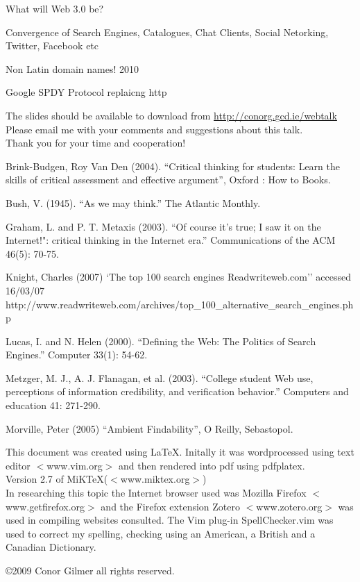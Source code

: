 \documentclass[30pt,landscape,footrule]{foils}
\begin{document}
{\color{magenta}
What will Web 3.0 be?
\begin{itemize}
\small{
\item Convergence of Search Engines, Catalogues, Chat Clients, Social Netorking, Twitter, Facebook etc
\item Non Latin domain names! 2010
\item Google SPDY Protocol replaicng http
}
\end{itemize}
}



\pausecolorreset

The slides should be available to download from 
\href{http://conorg.gcd.ie/webtalk/}{http://conorg.gcd.ie/webtalk}
Please email me with your comments and suggestions about this talk.\\
Thank you for your time and cooperation!

\begin{itemize}
\small {
\item Brink-Budgen, Roy Van Den (2004). ``Critical thinking for students: Learn the skills of critical assessment and effective argument'', Oxford : How to Books.
\item Bush, V. (1945). ``As we may think.'' The Atlantic Monthly.
\item Graham, L. and P. T. Metaxis (2003). ``Of course it's true; I saw it on the Internet!": critical thinking in the Internet era.'' Communications of the ACM 46(5): 70-75.
\item Knight, Charles (2007) `The top 100 search engines Readwriteweb.com'' accessed 16/03/07 http://www.readwriteweb.com/archives/top\_100\_alternative\_search\_engines.php
\item Lucas, I. and N. Helen (2000). ``Defining the Web: The Politics of Search Engines.'' Computer 33(1): 54-62.
\item Metzger, M. J., A. J. Flanagan, et al. (2003). ``College student Web use, perceptions of information credibility, and verification behavior.'' Computers and education 41: 271-290.
\item Morville, Peter (2005) ``Ambient Findability'', O Reilly, Sebastopol.
}
\end{itemize}


This document was created using \LaTeX{}. Initally it was wordprocessed using text editor $<${www.vim.org}$>$ and then rendered into pdf using pdfplatex. \\
Version 2.7 of MiKTeX($<${www.miktex.org}$>$)\\ In researching this topic the Internet browser used was Mozilla Firefox  $<${www.getfirefox.org}$>$ and the Firefox extension Zotero $<${www.zotero.org}$>$ was used  in compiling websites consulted. The Vim plug-in SpellChecker.vim was used to correct my spelling, checking using an American, a British and a Canadian Dictionary.

\copyright 2009 Conor Gilmer  all rights reserved.
\end{document}
